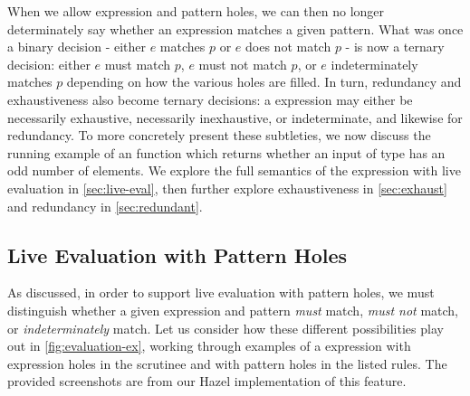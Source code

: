 When we allow expression and pattern holes, we can then no longer determinately say whether an expression matches a given pattern. What was once a binary decision - either $e$ matches $p$ or $e$ does not match $p$ - is now a ternary decision: either $e$ must match $p$, $e$ must not match $p$, or $e$ indeterminately matches $p$ depending on how the various holes are filled. In turn, redundancy and exhaustiveness also become ternary decisions: a  expression may either be necessarily exhaustive, necessarily inexhaustive, or indeterminate, and likewise for redundancy. To more concretely present these subtleties, we now discuss the running example of an  function which returns whether an input of type \li{[Int]} has an odd number of elements. We explore the full semantics of the  expression with live evaluation in \autoref{sec:live-eval}, then further explore exhaustiveness in \autoref{sec:exhaust} and redundancy in \autoref{sec:redundant}.

\subsection{Live Evaluation with Pattern Holes}\label{sec:live-eval}

As discussed, in order to support live evaluation with pattern holes, we must distinguish whether a given expression and pattern \emph{must} match, \emph{must not} match, or \emph{indeterminately} match. Let us consider how these different possibilities play out in \autoref{fig:evaluation-ex}, working through examples of a  expression with expression holes in the scrutinee and with pattern holes in the listed rules. The provided screenshots are from our Hazel implementation of this feature.

